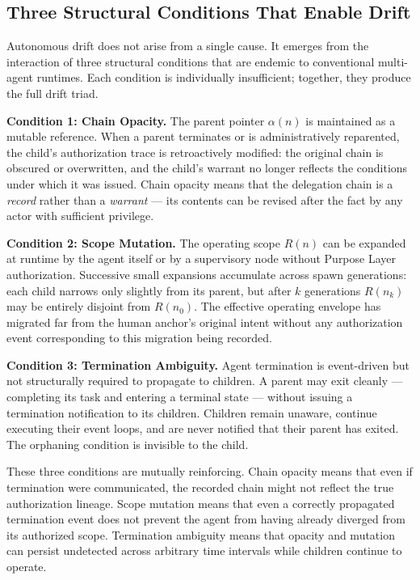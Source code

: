 \subsection{Three Structural Conditions That Enable Drift}

Autonomous drift does not arise from a single cause.  It emerges from the interaction of three structural conditions that are endemic to conventional multi-agent runtimes.  Each condition is individually insufficient; together, they produce the full drift triad.

\medskip
\noindent\textbf{Condition 1: Chain Opacity.}  The parent pointer $\alpha(n)$ is maintained as a mutable reference.  When a parent terminates or is administratively reparented, the child's authorization trace is retroactively modified: the original chain is obscured or overwritten, and the child's warrant no longer reflects the conditions under which it was issued.  Chain opacity means that the delegation chain is a \emph{record} rather than a \emph{warrant} — its contents can be revised after the fact by any actor with sufficient privilege.

\medskip
\noindent\textbf{Condition 2: Scope Mutation.}  The operating scope $R(n)$ can be expanded at runtime by the agent itself or by a supervisory node without Purpose Layer authorization.  Successive small expansions accumulate across spawn generations: each child narrows only slightly from its parent, but after $k$ generations $R(n_k)$ may be entirely disjoint from $R(n_0)$.  The effective operating envelope has migrated far from the human anchor's original intent without any authorization event corresponding to this migration being recorded.

\medskip
\noindent\textbf{Condition 3: Termination Ambiguity.}  Agent termination is event-driven but not structurally required to propagate to children.  A parent may exit cleanly — completing its task and entering a terminal state — without issuing a termination notification to its children.  Children remain unaware, continue executing their event loops, and are never notified that their parent has exited.  The orphaning condition is invisible to the child.

These three conditions are mutually reinforcing.  Chain opacity means that even if termination were communicated, the recorded chain might not reflect the true authorization lineage.  Scope mutation means that even a correctly propagated termination event does not prevent the agent from having already diverged from its authorized scope.  Termination ambiguity means that opacity and mutation can persist undetected across arbitrary time intervals while children continue to operate.

